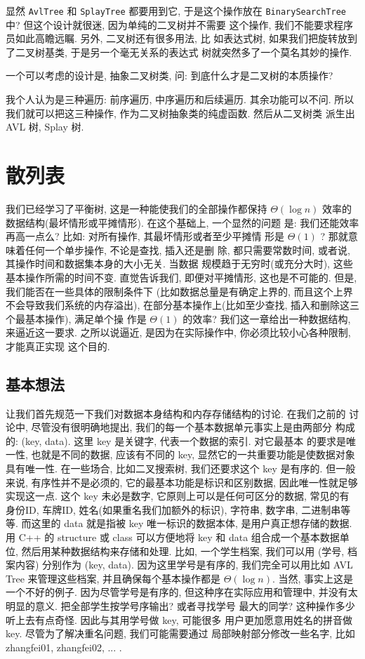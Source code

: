 \documentclass[a4paper]{ctexart}
\theoremstyle{definition}
\theoremstyle{definition}
\begin{document}
显然 \verb|AvlTree| 和 \verb|SplayTree| 都要用到它, 于是这个操作放在
\verb|BinarySearchTree| 中? 但这个设计就很迷, 因为单纯的二叉树并不需要
这个操作, 我们不能要求程序员如此高瞻远瞩. 另外, 二叉树还有很多用法, 比
如表达式树, 如果我们把旋转放到了二叉树基类, 于是另一个毫无关系的表达式
树就突然多了一个莫名其妙的操作.

一个可以考虑的设计是, 抽象二叉树类, 问: 到底什么才是二叉树的本质操作?

我个人认为是三种遍历: 前序遍历, 中序遍历和后续遍历. 其余功能可以不问.
所以我们就可以把这三种操作, 作为二叉树抽象类的纯虚函数. 然后从二叉树类
派生出 AVL 树, Splay 树.


\section{散列表}

我们已经学习了平衡树, 这是一种能使我们的全部操作都保持 $\Theta(\log
n)$ 效率的数据结构(最坏情形或平摊情形). 在这个基础上, 一个显然的问题
是: 我们还能效率再高一点么? 比如: 对所有操作, 其最坏情形或者至少平摊情
形是 $\Theta(1)$ ? 那就意味着任何一个单步操作, 不论是查找, 插入还是删
除, 都只需要常数时间, 或者说, 其操作时间和数据集本身的大小无关. 当数据
规模趋于无穷时(或充分大时), 这些基本操作所需的时间不变. 直觉告诉我们,
即便对平摊情形, 这也是不可能的. 但是, 我们能否在一些具体的限制条件下
(比如数据总量是有确定上界的, 而且这个上界不会导致我们系统的内存溢出),
在部分基本操作上(比如至少查找, 插入和删除这三个最基本操作), 满足单个操
作是 $\Theta(1)$ 的效率? 我们这一章给出一种数据结构, 来逼近这一要求.
之所以说逼近, 是因为在实际操作中, 你必须比较小心各种限制, 才能真正实现
这个目的.

\subsection{基本想法}

让我们首先规范一下我们对数据本身结构和内存存储结构的讨论. 在我们之前的
讨论中, 尽管没有很明确地提出, 我们的每一个基本数据单元事实上是由两部分
构成的: (key, data). 这里 key 是关键字, 代表一个数据的索引. 对它最基本
的要求是唯一性, 也就是不同的数据, 应该有不同的 key, 显然它的一共重要功能是使数据对象具有唯一性. 
在一些场合, 比如二叉搜索树, 我们还要求这个 key 是有序的. 但一般来说, 有序性并不是必须的,
它的最基本功能是标识和区别数据, 因此唯一性就足够实现这一点. 这个 key
未必是数字, 它原则上可以是任何可区分的数据, 常见的有 身份ID, 车牌ID,
姓名(如果重名我们加额外的标识), 字符串, 数字串, 二进制串等等. 而这里的
data 就是指被 key 唯一标识的数据本体, 是用户真正想存储的数据. 用 C++
的 structure 或 class 可以方便地将 key 和 data 组合成一个基本数据单位,
然后用某种数据结构来存储和处理. 比如, 一个学生档案, 我们可以用 (学号,
档案内容) 分别作为 (key, data). 因为这里学号是有序的, 我们完全可以用比如 
AVL Tree 来管理这些档案, 并且确保每个基本操作都是 $\Theta(\log n)$. 
当然, 事实上这是一个不好的例子. 因为尽管学号是有序的, 但这种序在实际应用和管理中, 
并没有太明显的意义. 把全部学生按学号序输出? 或者寻找学号
最大的同学? 这种操作多少听上去有点奇怪. 因此与其用学号做 key, 可能很多
用户更加愿意用姓名的拼音做 key. 尽管为了解决重名问题, 我们可能需要通过
局部映射部分修改一些名字, 比如 zhangfei01, zhangfei02, ... .
\end{document}
